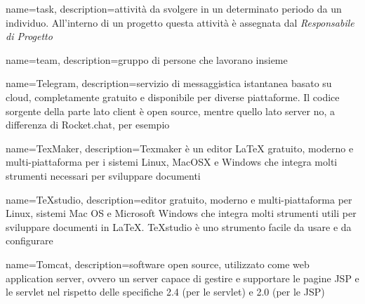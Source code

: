 

{
	name=task,
	description={attività da svolgere in un determinato periodo da un individuo. All'interno di un progetto questa attività è assegnata dal \textit{Responsabile di Progetto}}
}

{
	name=team,
	description={gruppo di persone che lavorano insieme}
}

{
	name=Telegram,
	description={servizio di messaggistica istantanea basato su cloud, completamente gratuito e disponibile per diverse piattaforme. Il codice sorgente della parte lato client è open source, mentre quello lato server no, a differenza di Rocket.chat, per esempio}
}

{
	name=TexMaker,
	description={Texmaker è un editor LaTeX gratuito, moderno e multi-piattaforma per i sistemi Linux, MacOSX e Windows che integra molti strumenti necessari per sviluppare documenti}
}

{
	name=TeXstudio,
	description={editor gratuito, moderno e multi-piattaforma per Linux, sistemi Mac OS e Microsoft Windows che integra molti strumenti utili per sviluppare documenti in \LaTeX. TeXstudio è uno strumento facile da usare e da configurare}
}

{
	name=Tomcat,
	description={software open source, utilizzato come web application server, ovvero un server capace di gestire e supportare le pagine JSP e le servlet nel rispetto delle specifiche 2.4 (per le servlet) e 2.0 (per le JSP)}
}




